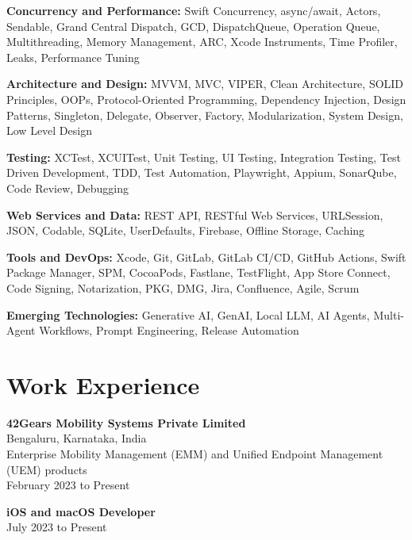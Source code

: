 \documentclass[letterpaper,11pt]{article}
\begin{document}
\vspace{3pt}
\textbf{Concurrency and Performance:} Swift Concurrency, async/await, Actors, Sendable,
Grand Central Dispatch, GCD, DispatchQueue, Operation Queue, Multithreading,
Memory Management, ARC, Xcode Instruments, Time Profiler, Leaks, Performance Tuning

\vspace{3pt}
\textbf{Architecture and Design:} MVVM, MVC, VIPER, Clean Architecture, SOLID Principles,
OOPs, Protocol-Oriented Programming, Dependency Injection, Design Patterns, Singleton,
Delegate, Observer, Factory, Modularization, System Design, Low Level Design

\vspace{3pt}
\textbf{Testing:} XCTest, XCUITest, Unit Testing, UI Testing, Integration Testing,
Test Driven Development, TDD, Test Automation, Playwright, Appium, SonarQube, Code Review,
Debugging

\vspace{3pt}
\textbf{Web Services and Data:} REST API, RESTful Web Services, URLSession, JSON, Codable,
SQLite, UserDefaults, Firebase, Offline Storage, Caching

\vspace{3pt}
\textbf{Tools and DevOps:} Xcode, Git, GitLab, GitLab CI/CD, GitHub Actions,
Swift Package Manager, SPM, CocoaPods, Fastlane, TestFlight, App Store Connect,
Code Signing, Notarization, PKG, DMG, Jira, Confluence, Agile, Scrum

\vspace{3pt}
\textbf{Emerging Technologies:} Generative AI, GenAI, Local LLM, AI Agents,
Multi-Agent Workflows, Prompt Engineering, Release Automation

\section*{Work Experience}

\textbf{42Gears Mobility Systems Private Limited} \\
Bengaluru, Karnataka, India \\
Enterprise Mobility Management (EMM) and Unified Endpoint Management (UEM) products \\
February 2023 to Present

\vspace{4pt}
\textbf{iOS and macOS Developer} \\
July 2023 to Present
\end{document}
